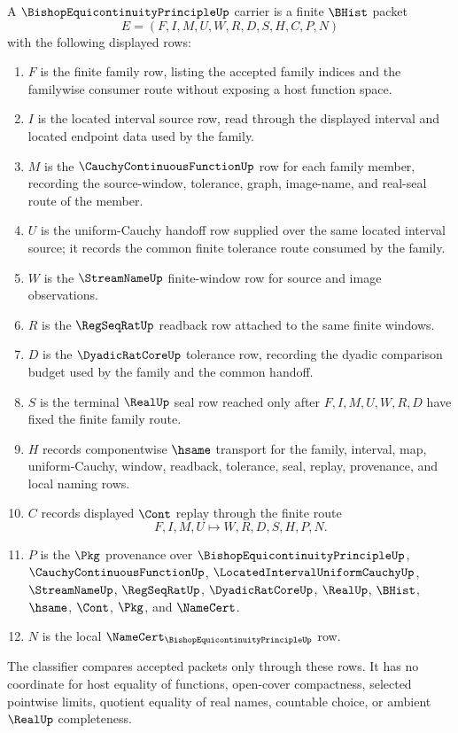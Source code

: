 \begin{definition}
\label{def:bishop-equicontinuity-principle-carrier}
A $\BishopEquicontinuityPrincipleUp$ carrier is a finite $\BHist$ packet
$$
E=(F,I,M,U,W,R,D,S,H,C,P,N)
$$
with the following displayed rows:
\begin{enumerate}
\item $F$ is the finite family row, listing the accepted family indices and the familywise consumer route without exposing a host function space.
\item $I$ is the located interval source row, read through the displayed interval and located endpoint data used by the family.
\item $M$ is the $\CauchyContinuousFunctionUp$ row for each family member, recording the source-window, tolerance, graph, image-name, and real-seal route of the member.
\item $U$ is the uniform-Cauchy handoff row supplied over the same located interval source; it records the common finite tolerance route consumed by the family.
\item $W$ is the $\StreamNameUp$ finite-window row for source and image observations.
\item $R$ is the $\RegSeqRatUp$ readback row attached to the same finite windows.
\item $D$ is the $\DyadicRatCoreUp$ tolerance row, recording the dyadic comparison budget used by the family and the common handoff.
\item $S$ is the terminal $\RealUp$ seal row reached only after $F,I,M,U,W,R,D$ have fixed the finite family route.
\item $H$ records componentwise $\hsame$ transport for the family, interval, map, uniform-Cauchy, window, readback, tolerance, seal, replay, provenance, and local naming rows.
\item $C$ records displayed $\Cont$ replay through the finite route
$$
F,I,M,U \longmapsto W,R,D,S,H,P,N .
$$
\item $P$ is the $\Pkg$ provenance over $\BishopEquicontinuityPrincipleUp$, $\CauchyContinuousFunctionUp$, $\LocatedIntervalUniformCauchyUp$, $\StreamNameUp$, $\RegSeqRatUp$, $\DyadicRatCoreUp$, $\RealUp$, $\BHist$, $\hsame$, $\Cont$, $\Pkg$, and $\NameCert$.
\item $N$ is the local $\NameCert_{\BishopEquicontinuityPrincipleUp}$ row.
\end{enumerate}
The classifier compares accepted packets only through these rows. It has no coordinate for host equality of functions, open-cover compactness, selected pointwise limits, quotient equality of real names, countable choice, or ambient $\RealUp$ completeness.
\end{definition}

